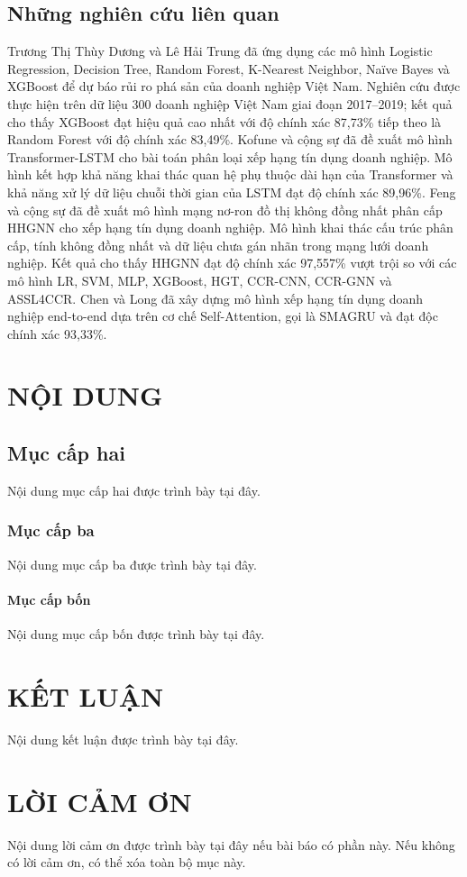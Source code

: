 \documentclass[10pt,twoside]{article}
\begin{document}
\subsection{Những nghiên cứu liên quan}
Trương Thị Thùy Dương và Lê Hải Trung \cite{thuy_ung_2023} đã ứng dụng các mô hình Logistic Regression, Decision Tree, Random Forest, K-Nearest Neighbor, Naïve Bayes và XGBoost để dự báo rủi ro phá sản của doanh nghiệp Việt Nam. Nghiên cứu được thực hiện trên dữ liệu 300 doanh nghiệp Việt Nam giai đoạn 2017–2019; kết quả cho thấy XGBoost đạt hiệu quả cao nhất với độ chính xác 87,73\% tiếp theo là Random Forest với độ chính xác 83,49\%.
Kofune và cộng sự \cite{kofune_enhancing_2026} đã đề xuất mô hình Transformer-LSTM cho bài toán phân loại xếp hạng tín dụng doanh nghiệp. Mô hình kết hợp khả năng khai thác quan hệ phụ thuộc dài hạn của Transformer và khả năng xử lý dữ liệu chuỗi thời gian của LSTM đạt độ chính xác 89,96\%. Feng và cộng sự \cite{feng_corporate_2024} đã đề xuất mô hình mạng nơ-ron đồ thị không đồng nhất phân cấp HHGNN cho xếp hạng tín dụng doanh nghiệp. Mô hình khai thác cấu trúc phân cấp, tính không đồng nhất và dữ liệu chưa gán nhãn trong mạng lưới doanh nghiệp. Kết quả cho thấy HHGNN đạt độ chính xác 97,557\% vượt trội so với các mô hình LR, SVM, MLP, XGBoost, HGT, CCR-CNN, CCR-GNN và ASSL4CCR. Chen và Long \cite{chen_novel_2020} đã xây dựng mô hình xếp hạng tín dụng doanh nghiệp end-to-end dựa trên cơ chế Self-Attention, gọi là SMAGRU và đạt độc chính xác 93,33\%. 
\section{NỘI DUNG}

\subsection{Mục cấp hai}

Nội dung mục cấp hai được trình bày tại đây.

\subsubsection{Mục cấp ba}

Nội dung mục cấp ba được trình bày tại đây.

\paragraph{Mục cấp bốn}

Nội dung mục cấp bốn được trình bày tại đây.


\section{KẾT LUẬN}

Nội dung kết luận được trình bày tại đây.

\section{LỜI CẢM ƠN}

Nội dung lời cảm ơn được trình bày tại đây nếu bài báo có phần này. Nếu không có lời cảm ơn, có thể xóa toàn bộ mục này.



\end{document}
